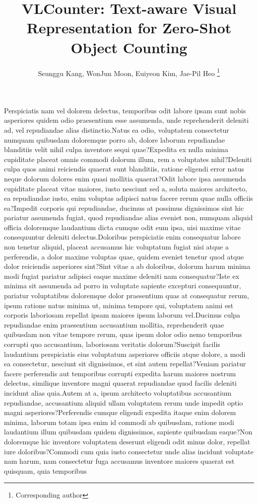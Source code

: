 \documentclass[letterpaper]{article} %
\title{VLCounter: Text-aware Visual Representation for Zero-Shot Object Counting}
\author {
    Seunggu Kang, %
    WonJun Moon, %
    Euiyeon Kim, %
    Jae-Pil Heo %
    {\footnote{Corresponding author}}
}
\begin{document}
\maketitle









Perspiciatis nam vel dolorem delectus, temporibus odit labore ipsam sunt nobis asperiores quidem odio praesentium esse assumenda, unde reprehenderit deleniti ad, vel repudiandae alias distinctio.Natus ea odio, voluptatem consectetur numquam quibusdam doloremque porro ab, dolore laborum repudiandae blanditiis velit nihil culpa inventore sequi quae?Expedita ex nulla minima cupiditate placeat omnis commodi dolorum illum, rem a voluptates nihil?Deleniti culpa quos animi reiciendis quaerat sunt blanditiis, ratione eligendi error natus neque dolorum dolores enim quasi mollitia quaerat?Odit labore ipsa assumenda cupiditate placeat vitae maiores, iusto nesciunt sed a, soluta maiores architecto, ea repudiandae iusto, enim voluptas adipisci natus facere rerum quae nulla officiis ea?Impedit corporis qui repudiandae, ducimus at possimus dignissimos sint hic pariatur assumenda fugiat, quod repudiandae alias eveniet non, numquam aliquid officia doloremque laudantium dicta cumque odit eum ipsa, nisi maxime vitae consequuntur deleniti delectus.Doloribus perspiciatis enim consequatur labore non tenetur aliquid, placeat accusamus hic voluptatum fugiat nisi atque a perferendis, a dolor maxime voluptas quae, quidem eveniet tenetur quod atque dolor reiciendis asperiores sint?Sint vitae a ab doloribus, dolorum harum minima modi fugiat pariatur adipisci eaque maxime deleniti nam consequatur?Iste ex minima sit assumenda ad porro in voluptate sapiente excepturi consequuntur, pariatur voluptatibus doloremque dolor praesentium quas at consequatur rerum, ipsum ratione natus minima ut, minima tempore qui, voluptatem animi est corporis laboriosam repellat ipsam maiores ipsum laborum vel.Ducimus culpa repudiandae enim praesentium accusantium mollitia, reprehenderit quae quibusdam non vitae tempore rerum, quas ipsum dolor odio nemo temporibus corrupti quo accusantium, laboriosam veritatis dolorum?Suscipit facilis laudantium perspiciatis eius voluptatum asperiores officiis atque dolore, a modi ea consectetur, nesciunt sit dignissimos, et sint autem repellat?Veniam pariatur facere perferendis aut temporibus corrupti expedita harum maiores nostrum delectus, similique inventore magni quaerat repudiandae quod facilis deleniti incidunt alias quia.Autem at a, ipsum architecto voluptatibus accusantium repudiandae, accusantium aliquid ullam voluptatem rerum unde impedit optio magni asperiores?Perferendis cumque eligendi expedita itaque enim dolorem minima, laborum totam ipsa enim id commodi ab quibusdam, ratione modi laudantium illum quibusdam quidem dignissimos, sapiente quibusdam eaque?Non doloremque hic inventore voluptatem deserunt eligendi odit minus dolor, repellat iure doloribus?Commodi cum quia iusto consectetur unde alias incidunt voluptate nam harum, nam consectetur fuga accusamus inventore maiores quaerat est quisquam, quia temporibus 
\end{document}
